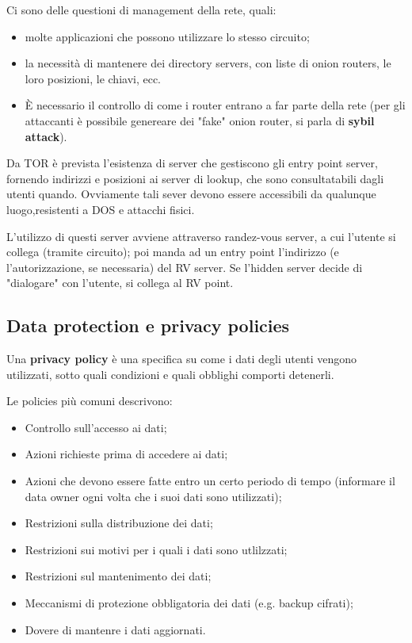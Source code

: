 \documentclass[a4paper, 10pt, twoside]{article}
\begin{document}
	Ci sono delle questioni di management della rete, quali: \begin{itemize}
		\item molte applicazioni che possono utilizzare lo stesso circuito;
		\item la necessità di mantenere dei directory servers, con liste di onion routers, le loro posizioni, le chiavi, ecc.
		\item È necessario il controllo di come i router entrano a far parte della rete (per gli attaccanti è possibile genereare dei "fake" onion router, si parla di \textbf{sybil attack}).
	\end{itemize}

	Da TOR è prevista l'esistenza di server che gestiscono gli entry point server, fornendo indirizzi e posizioni ai server di lookup, che sono consultatabili dagli utenti quando. Ovviamente tali sever devono essere accessibili da qualunque luogo,resistenti a DOS e attacchi fisici.

	L'utilizzo di questi server avviene attraverso randez-vous server, a cui l'utente si collega (tramite circuito); poi manda ad un entry point l'indirizzo (e l'autorizzazione, se necessaria) del RV server. Se l'hidden server decide di "dialogare" con l'utente, si collega al RV point.

	\subsection{Data protection e privacy policies}
	Una \textbf{privacy policy} è una specifica su come i dati degli utenti vengono utilizzati, sotto quali condizioni e quali obblighi comporti detenerli.

	Le policies più comuni descrivono: \begin{itemize}
		\item Controllo sull'accesso ai dati;
		\item Azioni richieste prima di accedere ai dati;
		\item Azioni che devono essere fatte entro un certo periodo di tempo (informare il data owner ogni volta che i suoi dati sono utilizzati);
		\item Restrizioni sulla distribuzione dei dati;
		\item Restrizioni sui motivi per i quali i dati sono utlilzzati;
		\item Restrizioni sul mantenimento dei dati;
		\item Meccanismi di protezione obbligatoria dei dati (e.g. backup cifrati);
		\item Dovere di mantenre i dati aggiornati.
	\end{itemize}
\end{document}
